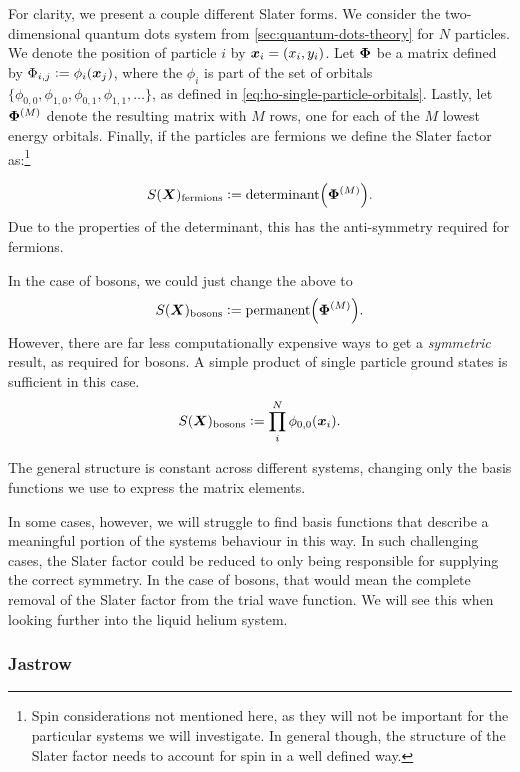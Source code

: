 \documentclass[Thesis.tex]{subfiles}
\begin{document}
For clarity, we present a couple different Slater forms. We consider the two-dimensional
quantum dots system from \cref{sec:quantum-dots-theory} for $N$ particles. We
denote the position of particle $i$ by $\bm{x}_i=(x_i, y_i)$. Let $\bm{\Phi}$ be a matrix defined by $\Phi_{i,j}
\vcentcolon= \phi_{i}(\bm{x}_j)$, where the $\phi_i$ is part of the set of orbitals
$\{\phi_{0,0}, \phi_{1,0},\phi_{0,1}, \phi_{1,1},\dots\}$, as defined in
\cref{eq:ho-single-particle-orbitals}. Lastly, let $\bm{\Phi}^{(M)}$ denote the
resulting matrix with $M$ rows, one for each of the $M$ lowest energy orbitals. Finally,
if the particles are fermions we define the Slater factor as:\footnote{Spin considerations not mentioned here, as they will not be important for the particular systems we will investigate. In general though, the structure of the Slater factor needs to account for spin in a well defined way.}

\begin{align}
    S(\bm{X})_\text{fermions} \vcentcolon= \text{determinant}\qty(\bm{\Phi}^{(M)}).
\end{align}
Due to the properties of the determinant, this has the anti-symmetry required for
fermions.

In the case of bosons, we could just change the above to
\begin{align}
    S(\bm{X})_\text{bosons} \vcentcolon= \text{permanent}\qty(\bm{\Phi}^{(M)}).
\end{align}
However, there are far less computationally expensive ways to get a \emph{symmetric}
result, as required for bosons. A simple product of single particle ground states is
sufficient in this case.
\begin{align}
    S(\bm{X})_\text{bosons} \vcentcolon= \prod_{i}^N \phi_{0,0}(\bm{x}_i).
\end{align}

The general structure is constant across different systems, changing only the basis
functions we use to express the matrix elements.

In some cases, however, we will struggle to find basis functions that describe a meaningful
portion of the systems behaviour in this way. In such challenging cases, the Slater factor
could be reduced to only being responsible for supplying the correct symmetry. In the case
of bosons, that would mean the complete removal of the Slater factor from the trial wave
function. We will see this when looking further into the liquid helium system.



\subsubsection*{Jastrow}
\end{document}
